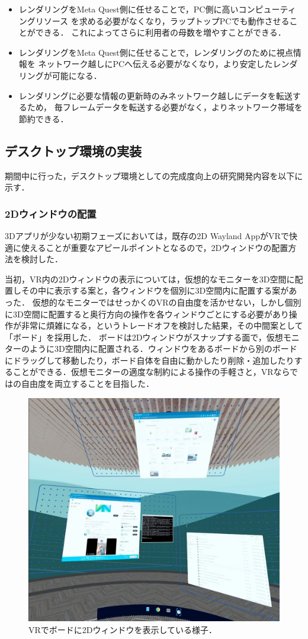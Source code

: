 \begin{itemize}
  \item レンダリングをMeta Quest側に任せることで，PC側に高いコンピューティングリソース
        を求める必要がなくなり，ラップトップPCでも動作させることができる．
        これによってさらに利用者の母数を増やすことができる．
  \item レンダリングをMeta Quest側に任せることで，レンダリングのために視点情報を
        ネットワーク越しにPCへ伝える必要がなくなり，より安定したレンダリングが可能になる．
  \item レンダリングに必要な情報の更新時のみネットワーク越しにデータを転送するため，
        毎フレームデータを転送する必要がなく，よりネットワーク帯域を節約できる．
\end{itemize}

\subsection{デスクトップ環境の実装}
期間中に行った，デスクトップ環境としての完成度向上の研究開発内容を以下に示す．

\subsubsection{2Dウィンドウの配置}
3Dアプリが少ない初期フェーズにおいては，既存の2D Wayland AppがVRで快適に使えることが重要なアピールポイントとなるので，2Dウィンドウの配置方法を検討した．

当初，VR内の2Dウィンドウの表示については，仮想的なモニターを3D空間に配置しその中に表示する案と，各ウィンドウを個別に3D空間内に配置する案があった．
仮想的なモニターではせっかくのVRの自由度を活かせない，しかし個別に3D空間に配置すると奥行方向の操作を各ウィンドウごとにする必要があり操作が非常に煩雑になる，というトレードオフを検討した結果，その中間案として「ボード」を採用した．
ボードは2Dウィンドウがスナップする面で，仮想モニターのように3D空間内に配置される．ウィンドウをあるボードから別のボードにドラッグして移動したり，ボード自体を自由に動かしたり削除・追加したりすることができる．仮想モニターの適度な制約による操作の手軽さと，VRならではの自由度を両立することを目指した．

\begin{figure}[htbp]
  \centering
  \includegraphics[keepaspectratio, width=0.7\linewidth]{fig/development/board-vr.jpeg}
  \caption{VRでボードに2Dウィンドウを表示している様子．}
  \label{fig:board-vr}
\end{figure}


